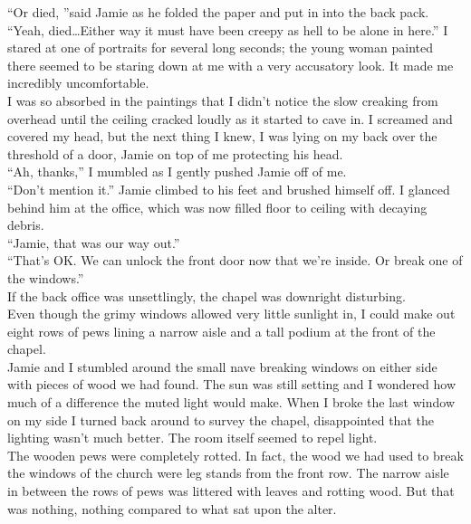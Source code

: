 \documentclass[a5paper]{scrartcl}
\begin{document}
\enquote{Or died, }said Jamie as he folded the paper and put in into the back pack. \\


\enquote{Yeah, died\dots Either way it must have been creepy as hell to be alone in here.} I stared at one of portraits for several long seconds; the young woman painted there seemed to be staring down at me with a very accusatory look. It made me incredibly uncomfortable. \\


I was so absorbed in the paintings that I didn't notice the slow creaking from overhead until the ceiling cracked loudly as it started to cave in. I screamed and covered my head, but the next thing I knew, I was lying on my back over the threshold of a door, Jamie on top of me protecting his head. \\


\enquote{Ah, thanks,} I mumbled as I gently pushed Jamie off of me. \\

\enquote{Don't mention it.} Jamie climbed to his feet and brushed himself off.
I glanced behind him at the office, which was now filled floor to ceiling with decaying debris.\\

\enquote{Jamie, that was our way out.} \\


\enquote{That's OK. We can unlock the front door now that we're inside. Or break one of the windows.}\\


If the back office was unsettlingly, the chapel was downright disturbing.\\


Even though the grimy windows allowed very little sunlight in, I could make out eight rows of pews lining a narrow aisle and a tall podium at the front of the chapel.\\


Jamie and I stumbled around the small nave breaking windows on either side with pieces of wood we had found. The sun was still setting and I wondered how much of a difference the muted light would make. When I broke the last window on my side I turned back around to survey the chapel, disappointed that the lighting wasn't much better. The room itself seemed to repel light.\\


The wooden pews were completely rotted. In fact, the wood we had used to break the windows of the church were leg stands from the front row. The narrow aisle in between the rows of pews was littered with leaves and rotting wood. But that was nothing, nothing compared to what sat upon the alter. \\
\end{document}

